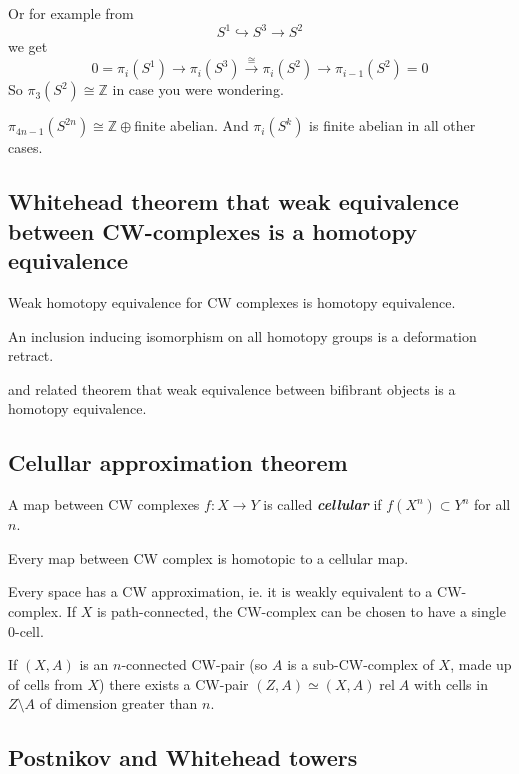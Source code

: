 Or for example from
\[S^1\hookrightarrow S^3\to S^2\]
we get
\[0=\pi_i(S^1)\to \pi_i(S^3)\overset{\cong}{\to}\pi_i(S^2)\to\pi_{i-1}(S^2)=0\]
So $\pi_3(S^2)\cong\mathbb{Z}$ in case you were wondering.
\begin{claim}[Serre]
	$\pi_{4n-1}(S^{2n})\cong\mathbb{Z}\oplus$finite abelian. And $\pi_i(S^k)$ is finite abelian in all other cases.
\end{claim}

\subsection{Whitehead theorem that weak equivalence between CW-complexes is a homotopy equivalence}

\begin{thm}[Whitehead]
	Weak homotopy equivalence for CW complexes is homotopy equivalence.

	An inclusion inducing isomorphism on all homotopy groups is a deformation retract.
\end{thm}


and related theorem that weak equivalence between bifibrant objects is a homotopy equivalence.
\subsection{Celullar approximation theorem}

\begin{defn}
	A map between CW complexes $f:X\to Y$ is called \textit{\textbf{cellular}} if $f(X^{n})\subset Y^{n}$ for all $n$.
\end{defn}
\begin{thm}
	Every map between CW complex is homotopic to a cellular map.
\end{thm}
\begin{thm}[CW approximation]
	Every space has a CW approximation, ie. it is weakly equivalent to a CW-complex.	
	If $X$ is path-connected, the CW-complex can be chosen to have a single 0-cell.

	If $(X,A)$ is an $n$-connected CW-pair (so $A$ is a sub-CW-complex of $X$, made up of cells from $X$) there exists a CW-pair $(Z,A)\simeq (X,A)\operatorname{rel}A$ with cells in $Z\setminus A$ of dimension greater than $n$.
\end{thm}

\subsection*{Postnikov and Whitehead towers}

